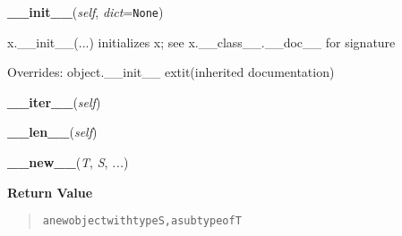     \vspace{0.5ex}

    \begin{boxedminipage}{\textwidth}

    \raggedright \textbf{\_\_init\_\_}(\textit{self}, \textit{dict}=\texttt{None})

    x.\_\_init\_\_(...) initializes x; see x.\_\_class\_\_.\_\_doc\_\_ for 
    signature

    \vspace{1ex}

      Overrides: object.\_\_init\_\_ 	extit{(inherited documentation)}

    \end{boxedminipage}

    \label{DataDict:DataDict:__iter__}

    \vspace{0.5ex}

    \begin{boxedminipage}{\textwidth}

    \raggedright \textbf{\_\_iter\_\_}(\textit{self})

    \end{boxedminipage}

    \label{DataDict:DataDict:__len__}

    \vspace{0.5ex}

    \begin{boxedminipage}{\textwidth}

    \raggedright \textbf{\_\_len\_\_}(\textit{self})

    \end{boxedminipage}

    \label{object:__new__}

    \vspace{0.5ex}

    \begin{boxedminipage}{\textwidth}

    \raggedright \textbf{\_\_new\_\_}(\textit{T}, \textit{S}, \textit{...})

    \vspace{1ex}

      \textbf{Return Value}
      \begin{quote}
\begin{alltt}
a new object with type S, a subtype of T
\end{alltt}

      \end{quote}

    \vspace{1ex}

    \end{boxedminipage}

